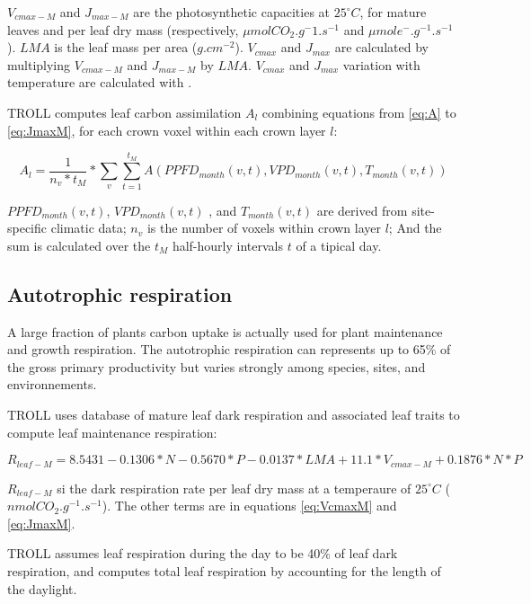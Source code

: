 \documentclass[12pt,]{article}
\theoremstyle{definition}
\theoremstyle{definition}
\theoremstyle{definition}
\theoremstyle{remark}
\begin{document}
\(V_{cmax-M}\) and \(J_{max-M}\) are the photosynthetic capacities at
\(25^\circ C\), for mature leaves and per leaf dry mass (respectively,
\(\mu mol CO_2.g^-1.s^{-1}\) and \(\mu mol e^-.g^{-1}.s^{-1}\)). \(LMA\)
is the leaf mass per area (\(g.cm^{-2}\)). \(V_{cmax}\) and \(J_{max}\)
are calculated by multiplying \(V_{cmax-M}\) and \(J_{max-M}\) by
\(LMA\). \(V_{cmax}\) and \(J_{max}\) variation with temperature are
calculated with \citet{BERNACCHI2003}.

TROLL computes leaf carbon assimilation \(A_l\) combining equations from
\eqref{eq:A} to \eqref{eq:JmaxM}, for each crown voxel within each crown
layer \(l\):

\begin{equation}
  A_l = \frac{1}{n_v*t_M} * \sum_v  \sum^{t_M}_{t=1} A(PPFD_{month}(v,t),VPD_{month}(v,t),T_{month}(v,t))
  \label{eq:Al}
\end{equation}

\(PPFD_{month}(v,t)\), \(VPD_{month}(v,t)\) , and \(T_{month}(v,t)\) are
derived from site-specific climatic data; \(n_v\) is the number of
voxels within crown layer \(l\); And the sum is calculated over the
\(t_M\) half-hourly intervals \(t\) of a tipical day.

\subsection{Autotrophic respiration}\label{autotrophic-respiration}

A large fraction of plants carbon uptake is actually used for plant
maintenance and growth respiration. The autotrophic respiration can
represents up to 65\% of the gross primary productivity but varies
strongly among species, sites, and environnements.

TROLL uses \citet{Atkin2015} database of mature leaf dark respiration
and associated leaf traits to compute leaf maintenance respiration:

\begin{equation}
  R_{leaf-M} = 8.5431-0.1306*N-0.5670*P-0.0137*LMA+11.1*V_{cmax-M}+0.1876*N*P
  \label{eq:Rl}
\end{equation}

\(R_{leaf-M}\) si the dark respiration rate per leaf dry mass at a
temperaure of \(25^\circ C\) (\(nmolCO_2.g^{-1}.s^{-1}\)). The other
terms are in equations \eqref{eq:VcmaxM} and \eqref{eq:JmaxM}.

TROLL assumes leaf respiration during the day to be 40\% of leaf dark
respiration, and computes total leaf respiration by accounting for the
length of the daylight.
\end{document}
